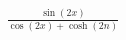 \documentclass[preview]{standalone}
\begin{document}
\begin{align*}
\frac{\sin(2x)}{\cos(2x)+\cosh(2n)}
\end{align*}
\end{document}
